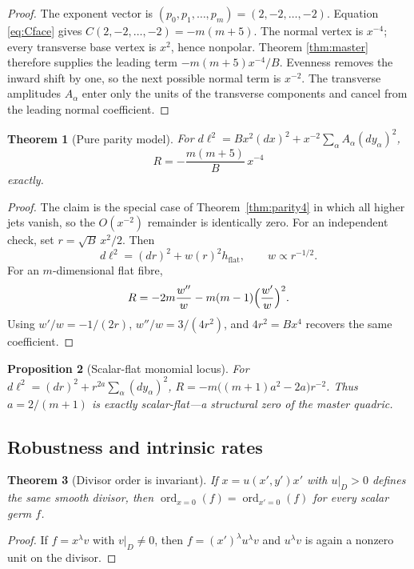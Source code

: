 \documentclass[11pt,a4paper]{article}
\newtheorem{theorem}{Theorem}[section]
\newtheorem{proposition}[theorem]{Proposition}
\theoremstyle{definition}
\theoremstyle{remark}
\newcommand{\ord}{\operatorname{ord}}
\begin{document}
\begin{proof}
The exponent vector is \((p_0,p_1,\ldots,p_m)=(2,-2,\ldots,-2)\). Equation
\eqref{eq:Cface} gives \(C(2,-2,\ldots,-2)=-m(m+5)\). The normal vertex is
\(x^{-4}\); every transverse base vertex is \(x^{2}\), hence nonpolar. Theorem
\ref{thm:master} therefore supplies the leading term
\(-m(m+5)x^{-4}/B\). Evenness removes the inward shift by one, so the next
possible normal term is \(x^{-2}\). The transverse amplitudes \(A_\alpha\) enter
only the units of the transverse components and cancel from the leading
normal coefficient.
\end{proof}

\begin{theorem}[Pure parity model]
\label{thm:pureparity}
For \(d\ell^2=Bx^2(dx)^2+x^{-2}\sum_\alpha A_\alpha(dy_\alpha)^2\),
\[
R=-\frac{m(m+5)}{B}\,x^{-4}
\]
exactly.
\end{theorem}

\begin{proof}
The claim is the special case of Theorem~\ref{thm:parity4} in which all higher
jets vanish, so the \(O(x^{-2})\) remainder is identically zero. For an
independent check, set \(r=\sqrt B\,x^2/2\). Then
\[
d\ell^2=(dr)^2+w(r)^2h_{\mathrm{flat}},
\qquad
w\propto r^{-1/2}.
\]
For an \(m\)-dimensional flat fibre,
\[
R=-2m\frac{w''}{w}-m(m-1)\Bigl(\frac{w'}{w}\Bigr)^2.
\]
Using \(w'/w=-1/(2r)\), \(w''/w=3/(4r^2)\), and \(4r^2=Bx^4\) recovers the same
coefficient.
\end{proof}

\begin{proposition}[Scalar-flat monomial locus]
\label{prop:scalarflat}
For \(d\ell^2=(dr)^2+r^{2a}\sum_\alpha(dy_\alpha)^2\),
\(R=-m\bigl((m+1)a^2-2a\bigr)r^{-2}\). Thus \(a=2/(m+1)\) is exactly
scalar-flat---a structural zero of the master quadric.
\end{proposition}

\subsection{Robustness and intrinsic rates}

\begin{theorem}[Divisor order is invariant]
\label{thm:ordinv}
If \(x=u(x',y')x'\) with \(u|_D>0\) defines the same smooth divisor, then
\(\ord_{x=0}(f)=\ord_{x'=0}(f)\) for every scalar germ \(f\).
\end{theorem}

\begin{proof}
If \(f=x^\lambda v\) with \(v|_D\neq0\), then
\(f=(x')^\lambda u^\lambda v\) and \(u^\lambda v\) is again a nonzero unit on
the divisor.
\end{proof}
\end{document}
